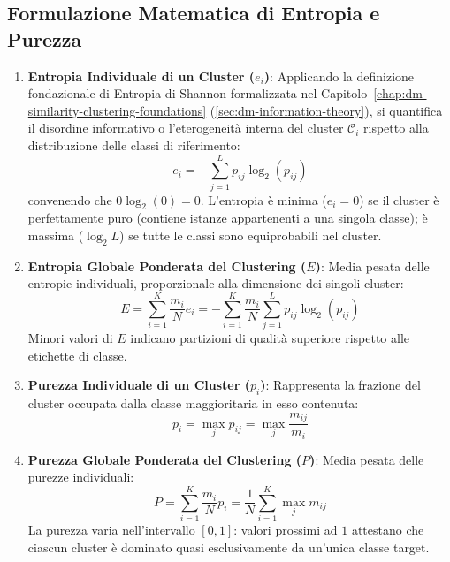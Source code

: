 \subsection{Formulazione Matematica di Entropia e Purezza}
\begin{enumerate}
    \item \textbf{Entropia Individuale di un Cluster ($e_i$)}: Applicando la definizione fondazionale di Entropia di Shannon formalizzata nel Capitolo~\ref{chap:dm-similarity-clustering-foundations} (\autoref{sec:dm-information-theory}), si quantifica il disordine informativo o l'eterogeneità interna del cluster $\mathcal{C}_i$ rispetto alla distribuzione delle classi di riferimento:
    \begin{equation}
    \label{eq:dm-entropy-single}
    e_i = - \sum_{j=1}^L p_{ij} \log_2(p_{ij})
    \end{equation}
    convenendo che $0 \log_2(0) = 0$. L'entropia è minima ($e_i = 0$) se il cluster è perfettamente puro (contiene istanze appartenenti a una singola classe); è massima ($\log_2 L$) se tutte le classi sono equiprobabili nel cluster.
    
    \item \textbf{Entropia Globale Ponderata del Clustering ($E$)}: Media pesata delle entropie individuali, proporzionale alla dimensione dei singoli cluster:
    \begin{equation}
    \label{eq:dm-entropy-global}
    E = \sum_{i=1}^K \frac{m_i}{N} e_i = - \sum_{i=1}^K \frac{m_i}{N} \sum_{j=1}^L p_{ij} \log_2(p_{ij})
    \end{equation}
    Minori valori di $E$ indicano partizioni di qualità superiore rispetto alle etichette di classe.
    
    \item \textbf{Purezza Individuale di un Cluster ($p_i$)}: Rappresenta la frazione del cluster occupata dalla classe maggioritaria in esso contenuta:
    \begin{equation}
    \label{eq:dm-purity-single}
    p_i = \max_j p_{ij} = \max_j \frac{m_{ij}}{m_i}
    \end{equation}
    
    \item \textbf{Purezza Globale Ponderata del Clustering ($P$)}: Media pesata delle purezze individuali:
    \begin{equation}
    \label{eq:dm-purity-global}
    P = \sum_{i=1}^K \frac{m_i}{N} p_i = \frac{1}{N} \sum_{i=1}^K \max_j m_{ij}
    \end{equation}
    La purezza varia nell'intervallo $[0, 1]$: valori prossimi ad $1$ attestano che ciascun cluster è dominato quasi esclusivamente da un'unica classe target.
\end{enumerate}

